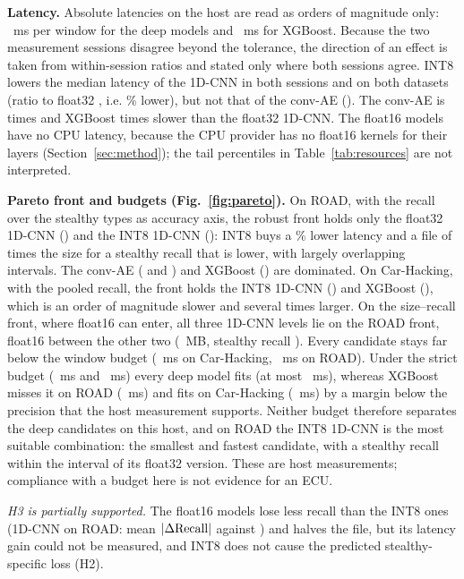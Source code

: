 \textbf{Latency.} Absolute latencies on the host are read as orders of magnitude only: \DeepLatRange~ms per window for
the deep models and \XGBLatRange~ms for XGBoost. Because the two measurement sessions disagree beyond the tolerance,
the direction of an effect is taken from within-session ratios and stated only where both sessions agree. INT8
lowers the median latency of the 1D-CNN in both sessions and on both datasets (ratio to float32 \CNNRatio, i.e.
\CNNCutPct\% lower), but not that of the conv-AE (\AERatio). The conv-AE is \AEvsCNN{} times and XGBoost \XGBvsCNN{}
times slower than the float32 1D-CNN. The float16 models have no CPU latency, because the CPU provider has no float16
kernels for their layers (Section~\ref{sec:method}); the tail percentiles in Table~\ref{tab:resources} are not
interpreted.

\textbf{Pareto front and budgets (Fig.~\ref{fig:pareto}).} On ROAD, with the recall over the stealthy types as accuracy axis, the robust
front holds only the float32 1D-CNN (\StealthCNNQZero) and the INT8 1D-CNN (\StealthCNNQTwo): INT8 buys a
\CNNCutPct\% lower latency and a file of \SizeRatioQTwo{} times the size for a stealthy recall that is \StealthDiff{}
lower, with largely overlapping intervals. The conv-AE (\StealthAEQZero{} and \StealthAEQTwo) and XGBoost
(\StealthXGB) are dominated. On Car-Hacking, with the pooled recall, the front holds the INT8 1D-CNN
(\PooledCHCNNQTwo) and XGBoost (\PooledCHXGB), which is an order of magnitude slower and several times larger. On the
size--recall front, where float16 can enter, all three 1D-CNN levels lie on the ROAD front, float16 between the other
two (\SizeCNNQOne~MB, stealthy recall \StealthCNNQOne). Every candidate stays far below the window budget
(\BudgetWindowCH~ms on Car-Hacking, \BudgetWindowROAD~ms on ROAD). Under the strict budget (\BudgetStrictCH~ms and
\BudgetStrictROAD~ms) every deep model fits (at most \DeepLatMax~ms), whereas XGBoost misses it on ROAD
(\XGBSlowROAD~ms) and fits on Car-Hacking (\XGBSlowCH~ms) by a margin below the precision that the host measurement
supports. Neither budget therefore separates the deep candidates on this host, and on ROAD the INT8 1D-CNN is the most
suitable combination: the smallest and fastest candidate, with a stealthy recall within the interval of its float32
version. These are host measurements; compliance with a budget here is not evidence for an ECU.

\emph{H3 is partially supported.} The float16 models lose less recall than the INT8 ones (1D-CNN on ROAD: mean $|\Delta\mathrm{Recall}|$
\AbsDRQOne{} against \AbsDRQTwo) and halves the file, but its latency gain could not be measured, and INT8 does not
cause the predicted stealthy-specific loss (H2).

